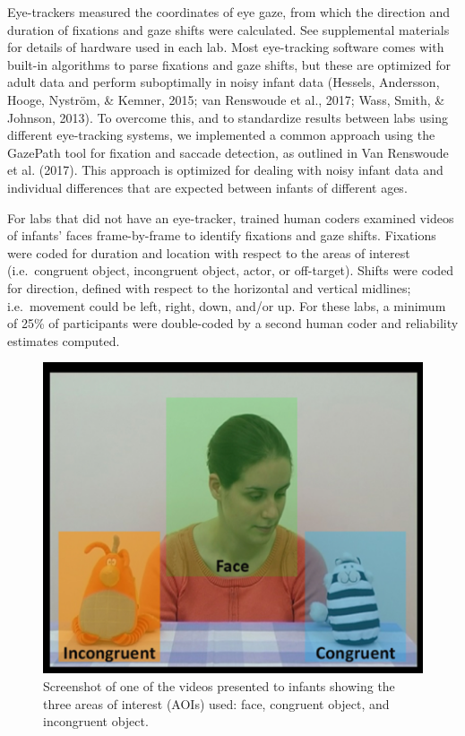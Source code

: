 \documentclass[,man,floatsintext]{apa6}
\begin{document}
Eye-trackers measured the coordinates of eye gaze, from which the direction and duration of fixations and gaze shifts were calculated. See supplemental materials for details of hardware used in each lab. Most eye-tracking software comes with built-in algorithms to parse fixations and gaze shifts, but these are optimized for adult data and perform suboptimally in noisy infant data (Hessels, Andersson, Hooge, Nyström, \& Kemner, 2015; van Renswoude et al., 2017; Wass, Smith, \& Johnson, 2013). To overcome this, and to standardize results between labs using different eye-tracking systems, we implemented a common approach using the GazePath tool for fixation and saccade detection, as outlined in Van Renswoude et al. (2017). This approach is optimized for dealing with noisy infant data and individual differences that are expected between infants of different ages.

For labs that did not have an eye-tracker, trained human coders examined videos of infants' faces frame-by-frame to identify fixations and gaze shifts. Fixations were coded for duration and location with respect to the areas of interest (i.e.~congruent object, incongruent object, actor, or off-target). Shifts were coded for direction, defined with respect to the horizontal and vertical midlines; i.e.~movement could be left, right, down, and/or up. For these labs, a minimum of 25\% of participants were double-coded by a second human coder and reliability estimates computed.

\begin{figure}
\centering
\includegraphics{Figure1}
\caption{\label{fig:fig1}Screenshot of one of the videos presented to infants showing the three areas of interest (AOIs) used: face, congruent object, and incongruent object.}
\end{figure}
\end{document}
